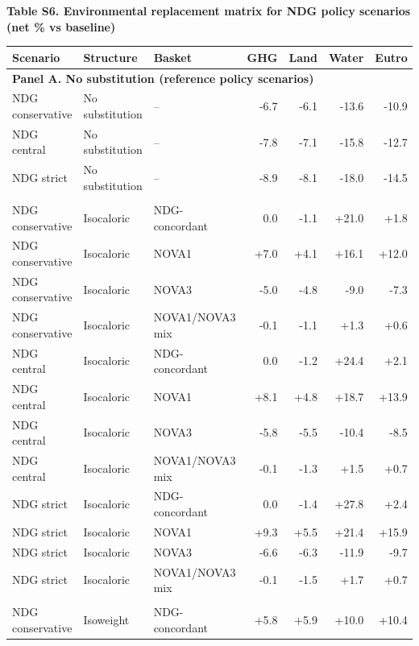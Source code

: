 ﻿\documentclass{article}
\newcommand{\manualtablecaption}[1]{%
  \par\centering\textbf{#1}\par\vspace{0.4em}%
}
\begin{document}
\vspace{0.8em}
\begin{table}[!htbp]
\centering
\manualtablecaption{Table S6. Environmental replacement matrix for NDG policy scenarios (net \% vs baseline)}
\scriptsize
\begin{tabular}{lllrrrr}
\toprule
\textbf{Scenario} & \textbf{Structure} & \textbf{Basket} & \textbf{GHG} & \textbf{Land} & \textbf{Water} & \textbf{Eutro}\\
\midrule
\multicolumn{7}{l}{\textbf{Panel A. No substitution (reference policy scenarios)}}\\
NDG conservative & No substitution & -- & -6.7 & -6.1 & -13.6 & -10.9\\
NDG central & No substitution & -- & -7.8 & -7.1 & -15.8 & -12.7\\
NDG strict & No substitution & -- & -8.9 & -8.1 & -18.0 & -14.5\\
\addlinespace
\multicolumn{7}{l}{\textbf{Panel B. Isocaloric substitution (replacement matrix)}}\\
NDG conservative & Isocaloric & NDG-concordant & 0.0 & -1.1 & +21.0 & +1.8\\
NDG conservative & Isocaloric & NOVA1 & +7.0 & +4.1 & +16.1 & +12.0\\
NDG conservative & Isocaloric & NOVA3 & -5.0 & -4.8 & -9.0 & -7.3\\
NDG conservative & Isocaloric & NOVA1/NOVA3 mix & -0.1 & -1.1 & +1.3 & +0.6\\
NDG central & Isocaloric & NDG-concordant & 0.0 & -1.2 & +24.4 & +2.1\\
NDG central & Isocaloric & NOVA1 & +8.1 & +4.8 & +18.7 & +13.9\\
NDG central & Isocaloric & NOVA3 & -5.8 & -5.5 & -10.4 & -8.5\\
NDG central & Isocaloric & NOVA1/NOVA3 mix & -0.1 & -1.3 & +1.5 & +0.7\\
NDG strict & Isocaloric & NDG-concordant & 0.0 & -1.4 & +27.8 & +2.4\\
NDG strict & Isocaloric & NOVA1 & +9.3 & +5.5 & +21.4 & +15.9\\
NDG strict & Isocaloric & NOVA3 & -6.6 & -6.3 & -11.9 & -9.7\\
NDG strict & Isocaloric & NOVA1/NOVA3 mix & -0.1 & -1.5 & +1.7 & +0.7\\
\addlinespace
\multicolumn{7}{l}{\textbf{Panel C. Isoweight substitution (replacement matrix)}}\\
NDG conservative & Isoweight & NDG-concordant & +5.8 & +5.9 & +10.0 & +10.4\\

\end{tabular}
\end{table}
\end{document}
